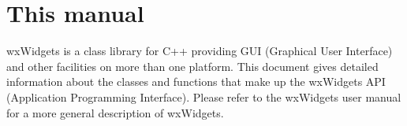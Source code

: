 \chapter{This manual}
%
%
\setfooter{\thepage}{}{}{}{}{\thepage}

wxWidgets is a class library for C++ providing GUI (Graphical User
Interface) and other facilities on more than one platform. This document
gives detailed information about the classes and functions that make up
the wxWidgets API (Application Programming Interface).  Please refer to the
wxWidgets user manual for a more general description of wxWidgets.





%
\setfooter{\thepage}{}{}{}{}{\thepage}
\printindex



